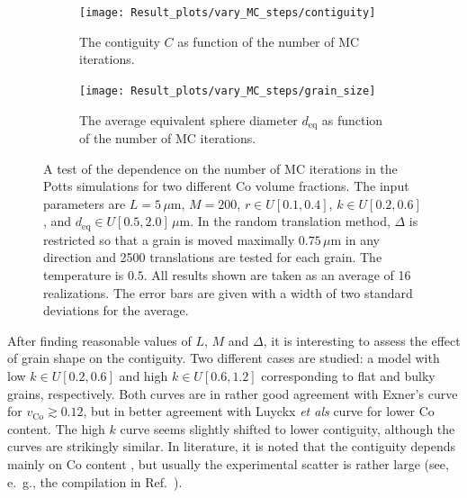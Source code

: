 \documentclass[10pt,a4paper]{article}
\begin{document}
\begin{figure}
	\begin{center}
		\begin{subfigure}[t]{.49\columnwidth}
			\centering
			\texttt{[image: Result\_plots/vary\_MC\_steps/contiguity]}
			\caption{The contiguity $C$ as function of the number of MC iterations.}
			\label{fig:vary_MC_steps_vol_frac}
		\end{subfigure}
		\begin{subfigure}[t]{.49\columnwidth}
			\centering
			\texttt{[image: Result\_plots/vary\_MC\_steps/grain\_size]}
			\caption{The average equivalent sphere diameter $d_\text{eq}$ as function of the number of MC iterations. }
			\label{fig:vary_MC_steps_contiguity}
		\end{subfigure}
		\caption{A test of the dependence on the number of MC iterations in the Potts simulations for two different Co volume fractions. The input parameters are $L=5 \, \mu\text{m}$, $M=200$, $r \in U[0.1, 0.4]$, $k \in U[0.2, 0.6]$, and $d_\text{eq} \in U[0.5, 2.0] \, \mu\text{m}$. In the random translation method, $\Delta$ is restricted so that a grain is moved maximally $0.75 \, \mu \text{m}$ in any direction and 2500 translations are tested for each grain.  The temperature is $0.5$. All results shown are taken as an average of 16 realizations. The error bars are given with a width of two standard deviations for the average.}
		\label{fig:vary_MC_steps}
	\end{center}
\end{figure}

After finding reasonable values of $L$, $M$ and $\Delta$, it is interesting to assess the effect of grain shape on the contiguity. Two different cases are studied: a model with low $k \in U[0.2, 0.6]$ and high $k \in U[0.6, 1.2]$ corresponding to flat and bulky grains, respectively. Both curves are in rather good agreement with Exner's curve \cite{Ex79} for $v_\text{Co} \gtrsim 0.12$, but in better agreement with Luyckx \textit{et als} curve \cite{LuLo06} for lower Co content. The high $k$ curve seems slightly shifted to lower contiguity, although the curves are strikingly similar. In literature, it is noted that the contiguity depends mainly on Co content \cite{LuLo06}, but usually the experimental scatter is rather large (see, e.~g., the compilation in Ref.~\cite{LaMi14}).
\end{document}
